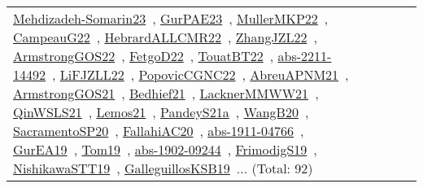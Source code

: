 {\begin{longtable}{lp{3cm}>{\raggedright\arraybackslash}p{6cm}>{\raggedright\arraybackslash}p{6cm}>{\raggedright\arraybackslash}p{8cm}}
\href{works/Mehdizadeh-Somarin23.pdf}{Mehdizadeh-Somarin23}~\cite{Mehdizadeh-Somarin23}, \href{works/GurPAE23.pdf}{GurPAE23}~\cite{GurPAE23}, \href{works/MullerMKP22.pdf}{MullerMKP22}~\cite{MullerMKP22}, \href{works/CampeauG22.pdf}{CampeauG22}~\cite{CampeauG22}, \href{works/HebrardALLCMR22.pdf}{HebrardALLCMR22}~\cite{HebrardALLCMR22}, \href{works/ZhangJZL22.pdf}{ZhangJZL22}~\cite{ZhangJZL22}, \href{works/ArmstrongGOS22.pdf}{ArmstrongGOS22}~\cite{ArmstrongGOS22}, \href{works/FetgoD22.pdf}{FetgoD22}~\cite{FetgoD22}, \href{works/TouatBT22.pdf}{TouatBT22}~\cite{TouatBT22}, \href{works/abs-2211-14492.pdf}{abs-2211-14492}~\cite{abs-2211-14492}, \href{works/LiFJZLL22.pdf}{LiFJZLL22}~\cite{LiFJZLL22}, \href{works/PopovicCGNC22.pdf}{PopovicCGNC22}~\cite{PopovicCGNC22}, \href{works/AbreuAPNM21.pdf}{AbreuAPNM21}~\cite{AbreuAPNM21}, \href{works/ArmstrongGOS21.pdf}{ArmstrongGOS21}~\cite{ArmstrongGOS21}, \href{works/Bedhief21.pdf}{Bedhief21}~\cite{Bedhief21}, \href{works/LacknerMMWW21.pdf}{LacknerMMWW21}~\cite{LacknerMMWW21}, \href{works/QinWSLS21.pdf}{QinWSLS21}~\cite{QinWSLS21}, \href{works/Lemos21.pdf}{Lemos21}~\cite{Lemos21}, \href{works/PandeyS21a.pdf}{PandeyS21a}~\cite{PandeyS21a}, \href{works/WangB20.pdf}{WangB20}~\cite{WangB20}, \href{works/SacramentoSP20.pdf}{SacramentoSP20}~\cite{SacramentoSP20}, \href{works/FallahiAC20.pdf}{FallahiAC20}~\cite{FallahiAC20}, \href{works/abs-1911-04766.pdf}{abs-1911-04766}~\cite{abs-1911-04766}, \href{works/GurEA19.pdf}{GurEA19}~\cite{GurEA19}, \href{works/Tom19.pdf}{Tom19}~\cite{Tom19}, \href{works/abs-1902-09244.pdf}{abs-1902-09244}~\cite{abs-1902-09244}, \href{works/FrimodigS19.pdf}{FrimodigS19}~\cite{FrimodigS19}, \href{works/NishikawaSTT19.pdf}{NishikawaSTT19}~\cite{NishikawaSTT19}, \href{works/GalleguillosKSB19.pdf}{GalleguillosKSB19}~\cite{GalleguillosKSB19}... (Total: 92)\\

\end{longtable}}

